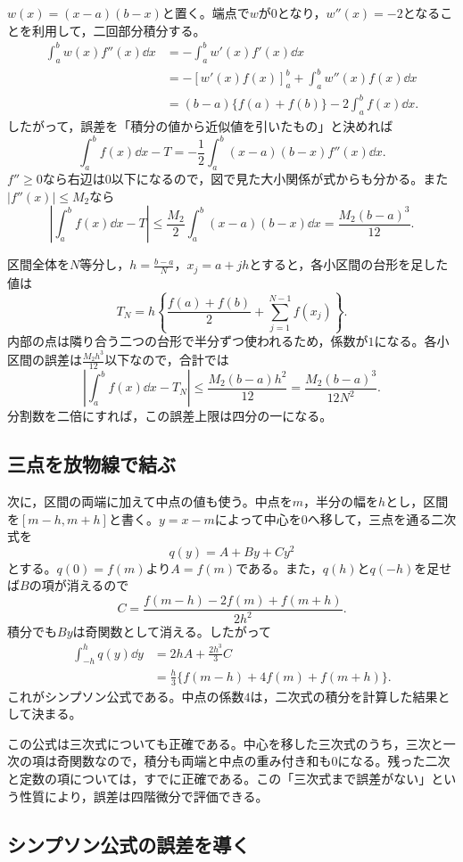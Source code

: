 $w(x)=(x-a)(b-x)$と置く。端点で$w$が$0$となり，$w''(x)=-2$となることを利用して，二回部分積分する。
\[
\begin{aligned}
 \int_a^b w(x)f''(x)\dd x
 &=-\int_a^bw'(x)f'(x)\dd x\\
 &=-[w'(x)f(x)]_a^b+\int_a^bw''(x)f(x)\dd x\\
 &=(b-a)\{f(a)+f(b)\}-2\int_a^bf(x)\dd x.
\end{aligned}
\]
したがって，誤差を「積分の値から近似値を引いたもの」と決めれば
\[
 \boxed{\int_a^bf(x)\dd x-T
 =-\frac12\int_a^b(x-a)(b-x)f''(x)\dd x}.
\]
$f''\geq0$なら右辺は$0$以下になるので，図で見た大小関係が式からも分かる。また$|f''(x)|\leq M_2$なら
\[
 \left|\int_a^bf(x)\dd x-T\right|
 \leq\frac{M_2}{2}\int_a^b(x-a)(b-x)\dd x
 =\frac{M_2(b-a)^3}{12}.
\]

区間全体を$N$等分し，$h=\frac{b-a}{N}$，$x_j=a+jh$とすると，各小区間の台形を足した値は
\[
 T_N=h\left\{\frac{f(a)+f(b)}2+\sum_{j=1}^{N-1}f(x_j)\right\}.
\]
内部の点は隣り合う二つの台形で半分ずつ使われるため，係数が$1$になる。各小区間の誤差は$\frac{M_2h^3}{12}$以下なので，合計では
\[
 \left|\int_a^bf(x)\dd x-T_N\right|
 \leq\frac{M_2(b-a)h^2}{12}
 =\frac{M_2(b-a)^3}{12N^2}.
\]
分割数を二倍にすれば，この誤差上限は四分の一になる。

\subsection{三点を放物線で結ぶ}

次に，区間の両端に加えて中点の値も使う。中点を$m$，半分の幅を$h$とし，区間を$[m-h,m+h]$と書く。$y=x-m$によって中心を$0$へ移して，三点を通る二次式を
\[
 q(y)=A+By+Cy^2
\]
とする。$q(0)=f(m)$より$A=f(m)$である。また，$q(h)$と$q(-h)$を足せば$B$の項が消えるので
\[
 C=\frac{f(m-h)-2f(m)+f(m+h)}{2h^2}.
\]
積分でも$By$は奇関数として消える。したがって
\[
\begin{aligned}
 \int_{-h}^hq(y)\dd y
 &=2hA+\frac{2h^3}{3}C\\
 &=\frac h3\{f(m-h)+4f(m)+f(m+h)\}.
\end{aligned}
\]
これがシンプソン公式である。中点の係数$4$は，二次式の積分を計算した結果として決まる。

この公式は三次式についても正確である。中心を移した三次式のうち，三次と一次の項は奇関数なので，積分も両端と中点の重み付き和も$0$になる。残った二次と定数の項については，すでに正確である。この「三次式まで誤差がない」という性質により，誤差は四階微分で評価できる。

\subsection{シンプソン公式の誤差を導く}

